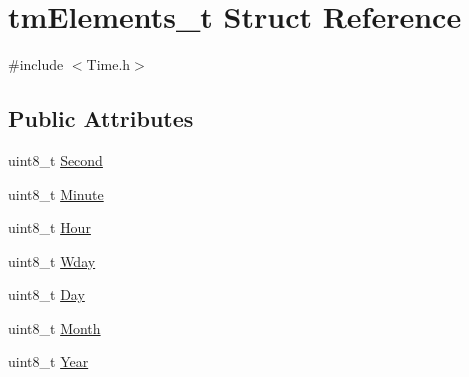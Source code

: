 \hypertarget{structtm_elements__t}{
\section{tmElements\_\-t Struct Reference}
\label{structtm_elements__t}
}


{\ttfamily \#include $<$Time.h$>$}

\subsection*{Public Attributes}
\begin{DoxyCompactItemize}
\item 
uint8\_\-t \hyperlink{structtm_elements__t_acd5c5f6eb6954a8df534149ea25f2fb4}{Second}
\item 
uint8\_\-t \hyperlink{structtm_elements__t_a8796a9859d5cf65f14efac3e2184ff37}{Minute}
\item 
uint8\_\-t \hyperlink{structtm_elements__t_a4e6dddb4b42b12c7323bff9a2e69164d}{Hour}
\item 
uint8\_\-t \hyperlink{structtm_elements__t_ae1f337c19bc58f7de1dfe21eb3edb525}{Wday}
\item 
uint8\_\-t \hyperlink{structtm_elements__t_aee91d673d261608c983a3c633f9771f2}{Day}
\item 
uint8\_\-t \hyperlink{structtm_elements__t_a8940c4da7431673c28414df19e1e1dcd}{Month}
\item 
uint8\_\-t \hyperlink{structtm_elements__t_a9992cbef99e28651b9905c90698e8ca9}{Year}
\end{DoxyCompactItemize}


